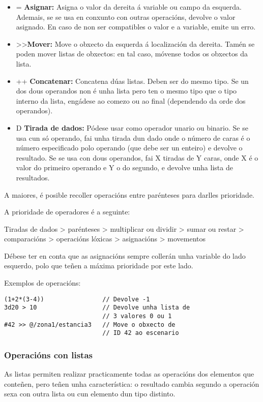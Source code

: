 \begin{itemize}
  Se polo menos un dos dous é verdadeiro, devolve 1, en caso contrario, devolve
  0.
  \item = {\bf Asignar:} Asigna o valor da dereita á variable ou campo da
  esquerda. Ademais, se se usa en conxunto con outras operacións, devolve o
  valor asignado. En caso de non ser compatibles o valor e a variable, emite un
  erro.
  \item \textgreater\textgreater {\bf Mover:} Move o obxecto da esquerda á
  localización da dereita. Tamén se poden mover listas de obxectos: en tal caso,
  móvense todos os obxectos da lista.
  \item ++ {\bf Concatenar:} Concatena dúas listas. Deben ser do mesmo tipo. Se
  un dos dous operandos non é unha lista pero ten o mesmo tipo que o tipo
  interno da lista, engádese ao comezo ou ao final (dependendo da orde dos
  operandos).
  \item D {\bf Tirada de dados:} Pódese usar como operador unario ou binario. Se
  se usa cun só operando, fai unha tirada dun dado onde o número de caras é o
  número especificado polo operando (que debe ser un enteiro) e devolve o
  resultado. Se se usa con dous operandos, fai X tiradas de Y caras, onde X é o
  valor do primeiro operando e Y o do segundo, e devolve unha lista de
  resultados.
\end{itemize}
\par A maiores, é posible recoller operacións entre parénteses para darlles
prioridade.
\par A prioridade de operadores é a seguinte:
\par
Tiradas de dados \textgreater{} parénteses \textgreater{} multiplicar ou dividir
\textgreater{} sumar ou restar \textgreater{} comparacións \textgreater{} operacións
lóxicas \textgreater{} asignacións \textgreater{} movementos
\par
Débese ter en conta que as asignacións sempre collerán unha variable do
lado esquerdo, polo que teñen a máxima prioridade por este lado.
\par Exemplos de operacións:
\begin{lstlisting}
(1+2*(3-4))                // Devolve -1
3d20 > 10                  // Devolve unha lista de 
                           // 3 valores 0 ou 1
#42 >> @/zona1/estancia3   // Move o obxecto de
                           // ID 42 ao escenario
\end{lstlisting}
\subsubsection{Operacións con listas}
As listas permiten realizar practicamente todas as operacións dos elementos que
conteñen, pero teñen unha característica: o resultado cambia segundo a operación
sexa con outra lista ou cun elemento dun tipo distinto.
